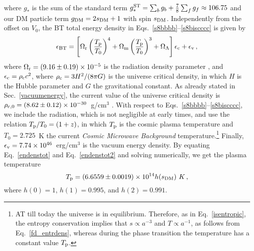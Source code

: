 \documentclass[twocolumn,showpacs, nofootinbib,aps,superscriptaddress, eqsecnum,prd,prl,notitlepage,showkeys,10pt,reprint]{revtex4-1}
\begin{document}
%
where $g_{*}$ is the sum of the standard term $g_{*}^{\rm ST}=\sum_b g_b+\frac{7}{8}\sum_f g_f\approx 106.75$ \cite{2008cosm.book.....W} and our DM particle term $g_{\rm DM}=2s_{\rm DM}+1$ with spin $s_{\rm DM}$.
Independently from the offset on $V_0$, the BT total energy density in Eqs.~\eqref{s8bbbb}--\eqref{s8biscccc} is given by
%
\begin{equation}
\label{endenstot}
\epsilon_{\rm BT}=\left[\Omega_{\rm r}\left(\frac{T_{\rm p}}{T_0}\right)^4 + \Omega_{\rm m}\left(\frac{T_{\rm p}}{T_0}\right)^3 + \Omega_\Lambda \right]\epsilon_{\rm c} + \epsilon_{\rm v}\,,
\end{equation}
%
where $\Omega_{\rm r}=(9.16\pm0.19)\times10^{-5}$ is the radiation density parameter \cite{2016A&A...594A..13P}, and $\epsilon_{\rm c}=\rho_{\rm c}c^2$, where $\rho_{\rm c}=3H^2/(8\pi G)$ is the universe critical density, in which $H$ is the Hubble parameter and $G$ the gravitational constant.
As already stated in Sec.~\ref{vacuumenergy}, the current value of the universe critical density is $\rho_{\rm c,0}=(8.62\pm0.12)\times10^{-30}$~g/cm$^3$ \cite{2016A&A...594A..13P}.
With respect to Eqs.~\eqref{s8bbbb}--\eqref{s8biscccc}, we include the radiation, which is not  negligible at early times, and use the relation $T_{\rm p}/T_0=(1+z)$, in which $T_{\rm p}$ is the cosmic plasma temperature and $T_0=2.725$~K the current \textit{Cosmic Microwave Background} temperature.\footnote{AT till today the universe is in equilibrium. Therefore, as in Eq.~\eqref{isentropic}, the entropy conservation implies that $s\propto a^{-3}$ and $T\propto a^{-1}$, as follows from Eq.~\eqref{fd_entrdens}, whereas during the phase transition the temperature has a constant value $T_{\rm p}$.}
Finally, $\epsilon_{\rm v}=7.74\times10^{46}$~erg/cm$^3$ is the vacuum energy density.
By equating Eq.~\eqref{endenstot} and Eq.~\eqref{endenstot2} and solving numerically, we get the plasma temperature
%
\begin{equation}
T_{\rm p}=(6.6559\pm0.0019)\times10^{14}h(s_{\rm DM})~K\,,
\end{equation}
%
where $h(0)=1$, $h(1)=0.995$, and $h(2)=0.991$.
\end{document}
